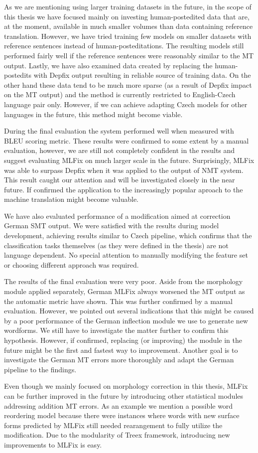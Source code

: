 As we are mentioning using larger training datasets in the future, in the scope of this thesis we have
focused mainly on investing human-postedited data that are, at the moment, available in much smaller
volumes than data containing reference translation. However, we have tried training few models on smaller
datasets with reference sentences instead of human-posteditations. The resulting models still performed
fairly well if the reference sentences were reasonably similar to the MT output. Lastly, we have
also examined data created by replacing the human-postedits with Depfix output resulting in reliable
source of training data. On the other hand these data tend to be much more sparse (as a result of Depfix
impact on the MT output) and the method is currently restricted to English-Czech language pair only.
However, if we can achieve adapting Czech models for other languages in the future, this method might
become viable.

During the final evaluation the system performed well when measured with BLEU scoring metric.
These results were confirmed to some extent by a manual evaluation, however, we are still not
completely confident in the results and suggest evaluating MLFix on much larger scale in the future.
Surprisingly, MLFix was able to surpass Depfix when it was applied to the output of NMT system.
This result caught our attention and will be investigated closely in the near future. If confirmed
the application to the increasingly popular aproach to the machine translation might become valuable.

We have also evaluated performance of a modification aimed at correction German SMT output. We were
satisfied with the results during model development, achieving results similar to Czech pipeline,
which confirms that the classification tasks themselves (as they were defined in the thesis) are
not language dependent. No special attention to manually modifying the feature set or choosing
different approach was required.

The results of the final evaluation were very poor. Aside from the morphology module applied separately,
German MLFix always worsened the MT output as the automatic metric have shown. This was further confirmed
by a manual evaluation. However, we pointed out
several indications that this might be caused by a poor performance of the German inflection module
we use to generate new wordforms. We still have to investigate the matter further to confirm this hypothesis.
However, if confirmed, replacing (or improving) the module in the future might be the first and fastest
way to improvement.
Another goal is to investigate the German MT errors more thoroughly and adapt the German pipeline to the findings.

Even though we mainly focused on morphology correction in this thesis, MLFix can be further improved
in the future by introducing other statistical modules addressing addition MT errors. As an example
we mention a possible word reordering model because there were instances where words with new surface
forms predicted by MLFix still needed rearangement to fully utilize the modification. Due to the modularity
of Treex framework, introducing new improvements to MLFix is easy.
